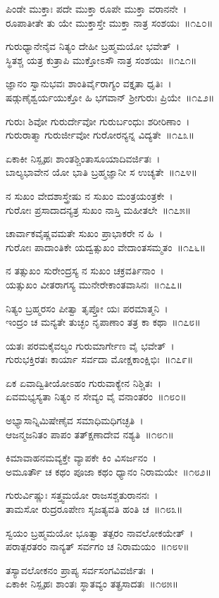 ಪಿಂಡೇ ಮುಕ್ತಾಃ ಪದೇ ಮುಕ್ತಾ ರೂಪೇ ಮುಕ್ತಾ ವರಾನನೇ~।\\
ರೂಪಾತೀತೇ ತು ಯೇ ಮುಕ್ತಾಸ್ತೇ ಮುಕ್ತಾ ನಾತ್ರ ಸಂಶಯಃ~॥೧೭೦॥

ಗುರುಧ್ಯಾನೇನೈವ ನಿತ್ಯಂ ದೇಹೀ ಬ್ರಹ್ಮಮಯೋ ಭವೇತ್~।\\
ಸ್ಥಿತಶ್ಚ ಯತ್ರ ಕುತ್ರಾಪಿ ಮುಕ್ತೋಽಸೌ ನಾತ್ರ ಸಂಶಯಃ~॥೧೭೧॥

ಜ್ಞಾನಂ ಸ್ವಾನುಭವಃ ಶಾಂತಿರ್ವೈರಾಗ್ಯಂ ವಕ್ತೃತಾ ಧೃತಿಃ~।\\
ಷಡ್ಗುಣೈಶ್ವರ್ಯಯುಕ್ತೋ ಹಿ ಭಗವಾನ್ ಶ್ರೀಗುರುಃ ಪ್ರಿಯೇ~॥೧೭೨॥

ಗುರುಃ ಶಿವೋ ಗುರುರ್ದೇವೋ ಗುರುರ್ಬಂಧುಃ ಶರೀರಿಣಾಂ~।\\
ಗುರುರಾತ್ಮಾ ಗುರುರ್ಜೀವೋ ಗುರೋರನ್ಯನ್ನ ವಿದ್ಯತೇ~॥೧೭೩॥

ಏಕಾಕೀ ನಿಸ್ಪೃಹಃ ಶಾಂತಶ್ಚಿಂತಾಸೂಯಾದಿವರ್ಜಿತಃ~।\\
ಬಾಲ್ಯಭಾವೇನ ಯೋ ಭಾತಿ ಬ್ರಹ್ಮಜ್ಞಾನೀ ಸ ಉಚ್ಯತೇ~॥೧೭೪॥

ನ ಸುಖಂ ವೇದಶಾಸ್ತ್ರೇಷು ನ ಸುಖಂ ಮಂತ್ರಯಂತ್ರಕೇ~।\\
ಗುರೋಃ ಪ್ರಸಾದಾದನ್ಯತ್ರ ಸುಖಂ ನಾಸ್ತಿ ಮಹೀತಲೇ~॥೧೭೫॥

ಚಾರ್ವಾಕವೈಷ್ಣವಮತೇ ಸುಖಂ ಪ್ರಾಭಾಕರೇ ನ ಹಿ~।\\
ಗುರೋಃ ಪಾದಾಂತಿಕೇ ಯದ್ವತ್ಸುಖಂ ವೇದಾಂತಸಮ್ಮತಂ~॥೧೭೬॥

ನ ತತ್ಸುಖಂ ಸುರೇಂದ್ರಸ್ಯ ನ ಸುಖಂ ಚಕ್ರವರ್ತಿನಾಂ~।\\
ಯತ್ಸುಖಂ ವೀತರಾಗಸ್ಯ ಮುನೇರೇಕಾಂತವಾಸಿನಃ~॥೧೭೭॥

ನಿತ್ಯಂ ಬ್ರಹ್ಮರಸಂ ಪೀತ್ವಾ ತೃಪ್ತೋ ಯಃ ಪರಮಾತ್ಮನಿ~।\\
ಇಂದ್ರಂ ಚ ಮನ್ಯತೇ ತುಚ್ಛಂ ನೃಪಾಣಾಂ ತತ್ರ ಕಾ ಕಥಾ~॥೧೭೮॥

ಯತಃ ಪರಮಕೈವಲ್ಯಂ ಗುರುಮಾರ್ಗೇಣ ವೈ ಭವೇತ್~।\\
ಗುರುಭಕ್ತಿರತಃ ಕಾರ್ಯಾ ಸರ್ವದಾ ಮೋಕ್ಷಕಾಂಕ್ಷಿಭಿಃ~॥೧೭೯॥

ಏಕ ಏವಾದ್ವಿತೀಯೋಽಹಂ ಗುರುವಾಕ್ಯೇನ ನಿಶ್ಚಿತಃ~।\\
ಏವಮಭ್ಯಸ್ಯತಾ ನಿತ್ಯಂ ನ ಸೇವ್ಯಂ ವೈ ವನಾಂತರಂ~॥೧೮೦॥

ಅಭ್ಯಾಸಾನ್ನಿಮಿಷೇಣೈವ ಸಮಾಧಿಮಧಿಗಚ್ಛತಿ~।\\
ಆಜನ್ಮಜನಿತಂ ಪಾಪಂ ತತ್ಕ್ಷಣಾದೇವ ನಶ್ಯತಿ~॥೧೮೧॥

ಕಿಮಾವಾಹನಮವ್ಯಕ್ತೇ ವ್ಯಾಪಕೇ ಕಿಂ ವಿಸರ್ಜನಂ~।\\
ಅಮೂರ್ತೌ ಚ ಕಥಂ ಪೂಜಾ ಕಥಂ ಧ್ಯಾನಂ ನಿರಾಮಯೇ~॥೧೮೨॥

ಗುರುರ್ವಿಷ್ಣುಃ ಸತ್ತ್ವಮಯೋ ರಾಜಸಶ್ಚತುರಾನನಃ~।\\
ತಾಮಸೋ ರುದ್ರರೂಪೇಣ ಸೃಜತ್ಯವತಿ ಹಂತಿ ಚ~॥೧೮೩॥

ಸ್ವಯಂ ಬ್ರಹ್ಮಮಯೋ ಭೂತ್ವಾ ತತ್ಪರಂ ನಾವಲೋಕಯೇತ್~।\\
ಪರಾತ್ಪರತರಂ ನಾನ್ಯತ್ ಸರ್ವಗಂ ಚ ನಿರಾಮಯಂ~॥೧೮೪॥

ತಸ್ಯಾವಲೋಕನಂ ಪ್ರಾಪ್ಯ ಸರ್ವಸಂಗವಿವರ್ಜಿತಃ~।\\
ಏಕಾಕೀ ನಿಸ್ಪೃಹಃ ಶಾಂತಃ ಸ್ಥಾತವ್ಯಂ ತತ್ಪ್ರಸಾದತಃ~॥೧೮೫॥

